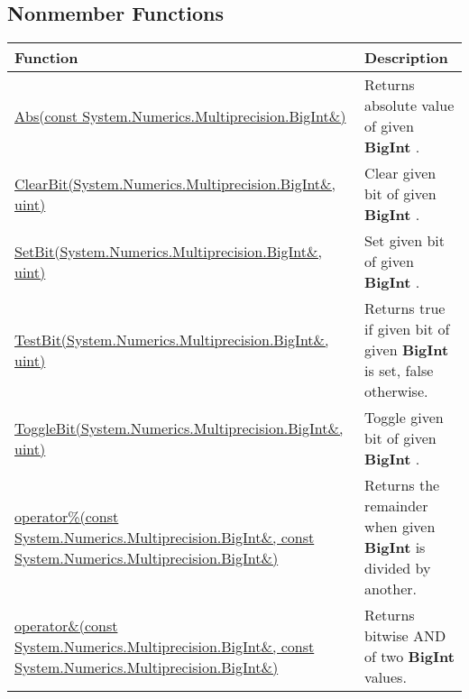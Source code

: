 \documentclass[a4paper,oneside,11.000000pt]{book}
\begin{document}
\subsection{Nonmember Functions}
\begin{flushleft}
\begin{supertabular}[l]{!{\raggedright}p{7.575cm}!{\raggedright}p{7.575cm}}
\textbf{Function}
& \textbf{Description}
\\
\hline
\hyperlink{System.Numerics.Multiprecision.Abs.C.R.System.Numerics.Multiprecision.BigInt}{Abs(const System.\-Numerics.\-Multiprecision.\-BigInt\&\-)}
& Returns absolute value of given \textbf{BigInt}
.

\\
\hyperlink{System.Numerics.Multiprecision.ClearBit.R.System.Numerics.Multiprecision.BigInt.uint}{ClearBit(System.\-Numerics.\-Multiprecision.\-BigInt\&\-, uint)}
& Clear given bit of given \textbf{BigInt}
.

\\
\hyperlink{System.Numerics.Multiprecision.SetBit.R.System.Numerics.Multiprecision.BigInt.uint}{SetBit(System.\-Numerics.\-Multiprecision.\-BigInt\&\-, uint)}
& Set given bit of given \textbf{BigInt}
.

\\
\hyperlink{System.Numerics.Multiprecision.TestBit.R.System.Numerics.Multiprecision.BigInt.uint}{TestBit(System.\-Numerics.\-Multiprecision.\-BigInt\&\-, uint)}
& Returns true if given bit of given \textbf{BigInt}
 is set, false otherwise.

\\
\hyperlink{System.Numerics.Multiprecision.ToggleBit.R.System.Numerics.Multiprecision.BigInt.uint}{ToggleBit(System.\-Numerics.\-Multiprecision.\-BigInt\&\-, uint)}
& Toggle given bit of given \textbf{BigInt}
.

\\
\hyperlink{System.Numerics.Multiprecision.operator.remainder.C.R.System.Numerics.Multiprecision.BigInt.C.R.System.Numerics.Multiprecision.BigInt}{operator\%(const System.\-Numerics.\-Multiprecision.\-BigInt\&\-, const System.\-Numerics.\-Multiprecision.\-BigInt\&\-)}
& Returns the remainder when given \textbf{BigInt}
 is divided by another.

\\
\hyperlink{System.Numerics.Multiprecision.operator.and.C.R.System.Numerics.Multiprecision.BigInt.C.R.System.Numerics.Multiprecision.BigInt}{operator\&\-(const System.\-Numerics.\-Multiprecision.\-BigInt\&\-, const System.\-Numerics.\-Multiprecision.\-BigInt\&\-)}
& Returns bitwise AND of two \textbf{BigInt}
 values.


\end{supertabular}
\end{flushleft}
\end{document}
